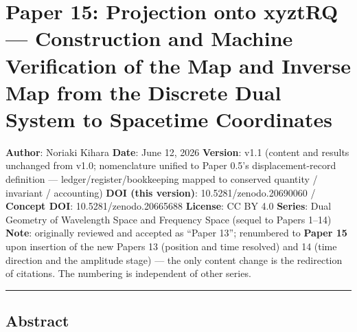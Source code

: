 \documentclass[
]{ltjsarticle}
\author{}
\date{}
\begin{document}
\section{Paper 15: Projection onto xyztRQ --- Construction and Machine
Verification of the Map and Inverse Map from the Discrete Dual System to
Spacetime
Coordinates}\label{paper-15-projection-onto-xyztrq-construction-and-machine-verification-of-the-map-and-inverse-map-from-the-discrete-dual-system-to-spacetime-coordinates}

\textbf{Author}: Noriaki Kihara \textbf{Date}: June 12, 2026
\textbf{Version}: v1.1 (content and results unchanged from v1.0;
nomenclature unified to Paper 0.5's displacement-record definition ---
ledger/register/bookkeeping mapped to conserved quantity / invariant /
accounting) \textbf{DOI (this version)}: 10.5281/zenodo.20690060 /
\textbf{Concept DOI}: 10.5281/zenodo.20665688 \textbf{License}: CC BY
4.0 \textbf{Series}: Dual Geometry of Wavelength Space and Frequency
Space (sequel to Papers 1--14) \textbf{Note}: originally reviewed and
accepted as ``Paper 13''; renumbered to \textbf{Paper 15} upon insertion
of the new Papers 13 (position and time resolved) and 14 (time direction
and the amplitude stage) --- the only content change is the redirection
of citations. The numbering is independent of other series.

\begin{center}\rule{0.5\linewidth}{0.5pt}\end{center}

\subsection{Abstract}\label{abstract}
\end{document}
